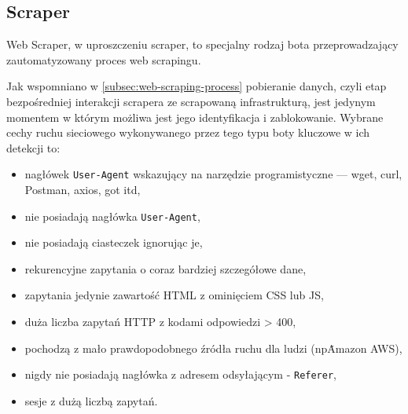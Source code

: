\subsection{Scraper}\label{subsec:scraper}

Web Scraper, w uproszczeniu scraper, to specjalny rodzaj bota przeprowadzający zautomatyzowany proces web scrapingu.

Jak wspomniano w \autoref{subsec:web-scraping-process} pobieranie danych, czyli etap bezpośredniej interakcji scrapera ze scrapowaną infrastrukturą,
jest jedynym momentem w którym możliwa jest jego identyfikacja i zablokowanie.
Wybrane cechy ruchu sieciowego wykonywanego przez tego typu boty kluczowe w ich detekcji to:

\begin{itemize}
    \item nagłówek \texttt{User-Agent} wskazujący na narzędzie programistyczne --- wget, curl, Postman, axios, got itd,
    \item nie posiadają nagłówka \texttt{User-Agent},
    \item nie posiadają ciasteczek ignorując je,
    \item rekurencyjne zapytania o coraz bardziej szczegółowe dane,
    \item zapytania jedynie zawartość HTML z ominięciem CSS lub JS,
    \item duża liczba zapytań HTTP z kodami odpowiedzi > 400,
    \item pochodzą z mało prawdopodobnego źródła ruchu dla ludzi (np\. Amazon AWS),
    \item nigdy nie posiadają nagłówka z adresem odsyłającym - \texttt{Referer},
    \item sesje z dużą liczbą zapytań\cite{bot-buster}.
\end{itemize}


